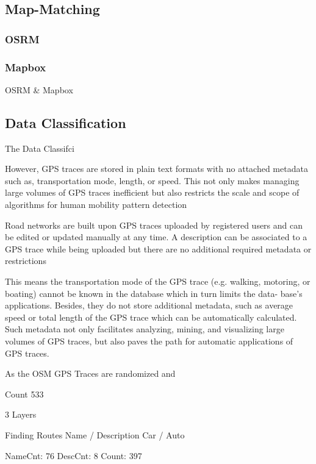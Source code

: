 \subsection{Map-Matching}

\subsubsection{OSRM}
\subsubsection{Mapbox}

OSRM & Mapbox



\autocite[]{Delling2012}

\subsection{Data Classification}

The Data Classifci

However, GPS traces are stored in plain text formats with no attached metadata such as, transportation mode, length, or speed. This not only makes managing large volumes of GPS traces inefficient but also restricts the scale and scope of algorithms for human mobility pattern detection

Road networks are built upon GPS traces uploaded by registered users and can be edited or updated manually at any time. A description can be associated to a GPS trace while being uploaded but there are no additional required metadata or restrictions

 This means the transportation mode of the GPS trace (e.g. walking, motoring, or boating) cannot be known in the database which in turn limits the data- base’s applications. Besides, they do not store additional metadata, such as average speed or total length of the GPS trace which can be automatically calculated. Such metadata not only facilitates analyzing, mining, and visualizing large volumes of GPS traces, but also paves the path for automatic applications of GPS traces.


\autocite[]{Zhang2012}

As the OSM GPS Traces are randomized and 

Count 533

3 Layers

Finding Routes Name / Description Car / Auto

NameCnt: 76
DescCnt: 8
Count: 397

